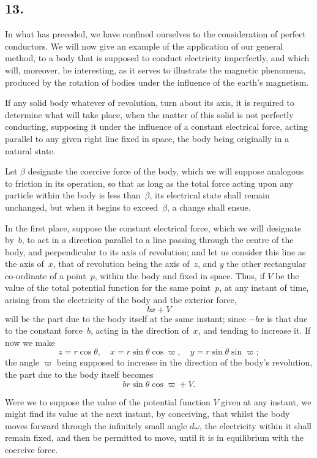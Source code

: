 \documentclass[12pt,notitlepage]{amsart}
\newcommand\Section[1]{\subsection{{#1}}}
\begin{document}
\Section{13.}
In what has preceded, we have confined ourselves to the consideration
of perfect conductors. We will now give an example of the application of
our general method, to a body that is supposed to conduct electricity 
imperfectly, and which will, moreover,
be interesting, as it serves to illustrate the
magnetic phenomena, produced by the rotation of bodies under the influence
of the earth's magnetism.

If any solid body whatever of revolution, turn about its axis, it is
required to determine what will take place, when the matter of this solid is
not perfectly conducting,
supposing it under the influence of a constant electrical
force, acting parallel to any given right line fixed in space, the body being
originally in a natural state.

Let $\beta$ designate the coercive force of the body, which we will suppose
analogous to friction in its operation,
so that as long as the total force acting
upon any particle within the body is less than~$\beta$,
its electrical state shall
remain unchanged, but when it begins to exceed~$\beta$, a change shall ensue.

In the first place, suppose the constant electrical force, which we will
designate by~$b$, to act in a direction parallel to a line passing through the
centre of the body, and perpendicular to its axis of revolution; and let us
consider this line as the axis of~$x$,
that of revolution being the axis of~$z$,
and $y$ the other rectangular co-ordinate of a point~$p$, within the body and
fixed in space. Thus, if $V$ be the value of the total potential function for
the same point~$p$, at any instant of time, arising from the electricity of the
body and the exterior force,
\[
bx+V
\]
will be the part due to the body itself at the same instant; since $-bx$ is
that due to the constant force~$b$, acting in the direction of~$x$, and tending
to increase it. If now we make
\[
z=r\cos\theta,\quad
x=r\sin\theta\cos\varpi,\quad
y=r\sin\theta\sin\varpi;
\]
the angle $\varpi$ being supposed to increase
in the direction of the body's revolution,
the part due to the body itself becomes
\[
br\sin\theta\cos\varpi+V.
\]

Were we to suppose the value of the potential function $V$ given at
any instant, we might find its value at the next instant, by conceiving, that
whilst the body moves forward through the infinitely small angle $d\omega$, the
electricity within it shall remain fixed, and then be permitted to move, until
it is in equilibrium with the coercive force.
\end{document}
